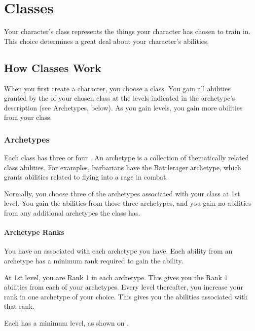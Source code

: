 \chapter{Classes}\label{Classes}

Your character's class represents the things your character has chosen to train in.
This choice determines a great deal about your character's abilities.

\section{How Classes Work}
    When you first create a character, you choose a class.
    You gain all abilities granted by the  of your chosen class at the levels indicated in the archetype's description (see Archetypes, below).
    As you gain levels, you gain more abilities from your class.

    \subsection{Archetypes}\label{Archetypes}
        Each class has three or four .
        An archetype is a collection of thematically related class abilities.
        For examples, barbarians have the Battlerager archetype, which grants abilities related to flying into a rage in combat.

        Normally, you choose three of the archetypes associated with your class at 1st level.
        You gain the abilities from those three archetypes, and you gain no abilities from any additional archetypes the class has.

        \subsubsection{Archetype Ranks}\label{Archetype Ranks}
            You have an  associated with each archetype you have.
            Each ability from an archetype has a minimum rank required to gain the ability.

            At 1st level, you are Rank 1 in each archetype.
            This gives you the Rank 1 abilities from each of your archetypes.
            Every level thereafter, you increase your rank in one archetype of your choice.
            This gives you the abilities associated with that rank.

            Each  has a minimum level, as shown on .

